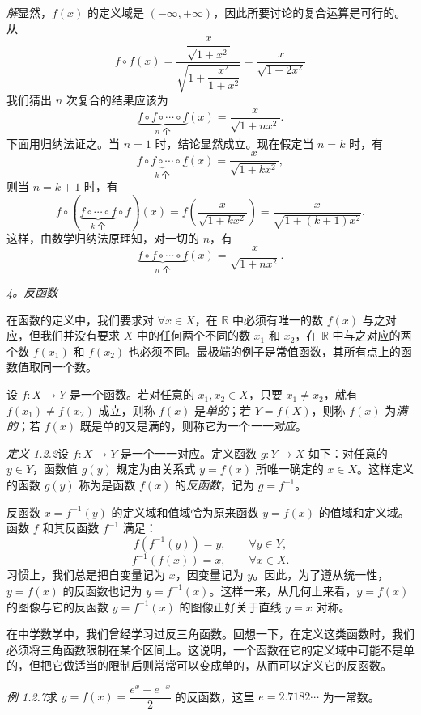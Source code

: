 \documentclass[UTF8,12pt,a4paper,fontset=fandol]{ctexbook}
\begin{document}
\noindent\emph{解}\quad 显然，$f(x)$ 的定义域是 $(-\infty,+\infty)$，因此所要讨论的复合运算是可行的。从
\[
  f\circ f(x)=
  \frac{\dfrac{x}{\sqrt{1+x^2}}}{\sqrt{1+\dfrac{x^2}{1+x^2}}}
  =\frac{x}{\sqrt{1+2x^2}}
\]
我们猜出 $n$ 次复合的结果应该为
\[
  \underbrace{f\circ f\circ\cdots\circ f}_{n\text{ 个}}(x)=\frac{x}{\sqrt{1+nx^2}}.
\]
下面用归纳法证之。当 $n=1$ 时，结论显然成立。现在假定当 $n=k$ 时，有
\[
  \underbrace{f\circ f\circ\cdots\circ f}_{k\text{ 个}}(x)=\frac{x}{\sqrt{1+kx^2}},
\]
则当 $n=k+1$ 时，有
\[
  f\circ(\underbrace{f\circ\cdots\circ f}_{k\text{ 个}}\circ f)(x)
  =f\left(\frac{x}{\sqrt{1+kx^2}}\right)
  =\frac{x}{\sqrt{1+(k+1)x^2}}.
\]
这样，由数学归纳法原理知，对一切的 $n$，有
\[
  \underbrace{f\circ f\circ\cdots\circ f}_{n\text{ 个}}(x)=\frac{x}{\sqrt{1+nx^2}}.
\]

\noindent\emph{4。反函数}

在函数的定义中，我们要求对 $\forall x\in X$，在 $\mathbb{R}$ 中必须有唯一的数 $f(x)$ 与之对应，但我们并没有要求 $X$ 中的任何两个不同的数 $x_1$ 和 $x_2$，在 $\mathbb{R}$ 中与之对应的两个数 $f(x_1)$ 和 $f(x_2)$ 也必须不同。最极端的例子是常值函数，其所有点上的函数值取同一个数。

设 $f:X\to Y$ 是一个函数。若对任意的 $x_1,x_2\in X$，只要 $x_1\ne x_2$，就有 $f(x_1)\ne f(x_2)$ 成立，则称 $f(x)$ 是\emph{单的}；若 $Y=f(X)$，则称 $f(x)$ 为\emph{满的}；若 $f(x)$ 既是单的又是满的，则称它为一个\emph{一一对应}。

\noindent\emph{定义 1.2.2}\quad 设 $f:X\to Y$ 是一个一一对应。定义函数 $g:Y\to X$ 如下：对任意的 $y\in Y$，函数值 $g(y)$ 规定为由关系式 $y=f(x)$ 所唯一确定的 $x\in X$。这样定义的函数 $g(y)$ 称为是函数 $f(x)$ 的\emph{反函数}，记为 $g=f^{-1}$。

反函数 $x=f^{-1}(y)$ 的定义域和值域恰为原来函数 $y=f(x)$ 的值域和定义域。函数 $f$ 和其反函数 $f^{-1}$ 满足：
\[
  f(f^{-1}(y))=y,\qquad \forall y\in Y,
\]
\[
  f^{-1}(f(x))=x,\qquad \forall x\in X.
\]
习惯上，我们总是把自变量记为 $x$，因变量记为 $y$。因此，为了遵从统一性，$y=f(x)$ 的反函数也记为 $y=f^{-1}(x)$。这样一来，从几何上来看，$y=f(x)$ 的图像与它的反函数 $y=f^{-1}(x)$ 的图像正好关于直线 $y=x$ 对称。

在中学数学中，我们曾经学习过反三角函数。回想一下，在定义这类函数时，我们必须将三角函数限制在某个区间上。这说明，一个函数在它的定义域中可能不是单的，但把它做适当的限制后则常常可以变成单的，从而可以定义它的反函数。

\noindent\emph{例 1.2.7}\quad 求 $y=f(x)=\dfrac{e^x-e^{-x}}{2}$ 的反函数，这里 $e=2.7182\cdots$ 为一常数。
\end{document}
